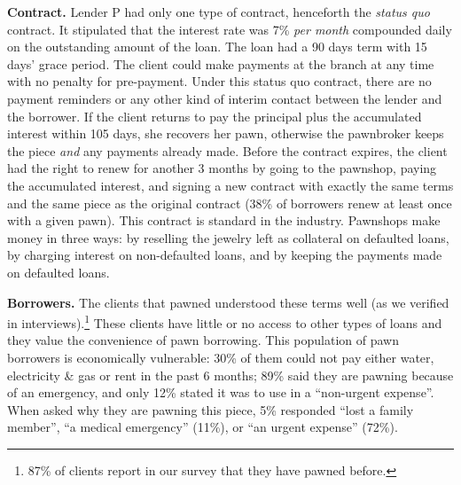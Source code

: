 \documentclass[11pt, a4paper]{article}
\begin{document}
\vspace{.2in}
\noindent \textbf{Contract.} Lender P had only one type of contract, henceforth the \textit{status quo} contract. It stipulated that the interest rate was 7\% \textit{per month} compounded daily on the outstanding amount of the loan. The loan had a 90 days term with 15 days' grace period. The client could make payments at the branch at any time with no penalty for pre-payment. Under this status quo contract, there are no payment reminders or any other kind of interim contact between the lender and the borrower. If the client returns to pay the principal plus the accumulated interest within 105 days, she recovers her pawn, otherwise the pawnbroker keeps the piece \textit{and} any payments already made. Before the contract expires, the client had the right to renew for another 3 months by going to the pawnshop, paying the accumulated interest, and signing a new contract with exactly the same terms and the same piece as the original contract (38\% of borrowers renew at least once with a given pawn). This contract is standard in the industry.  Pawnshops make money in three ways: by reselling the jewelry left as collateral on defaulted loans, by charging interest on non-defaulted loans, and by keeping the payments made on defaulted loans. 

\vspace{.2in}
\noindent \textbf{Borrowers.} The clients that pawned understood these terms well (as we verified in interviews).\footnote{87\% of clients report in our survey that they have pawned before.} These clients have little or no access to other types of loans and they value the convenience of pawn borrowing.  This population of pawn borrowers is economically vulnerable:  30\% of them could not pay either water, electricity \& gas or rent in the past 6 months; 89\% said they are pawning because of an emergency, and only 12\% stated it was to use in a ``non-urgent expense''.  When asked why they are pawning this piece, 5\% responded ``lost a family member'', ``a medical emergency'' (11\%), or ``an urgent expense'' (72\%).
\end{document}
